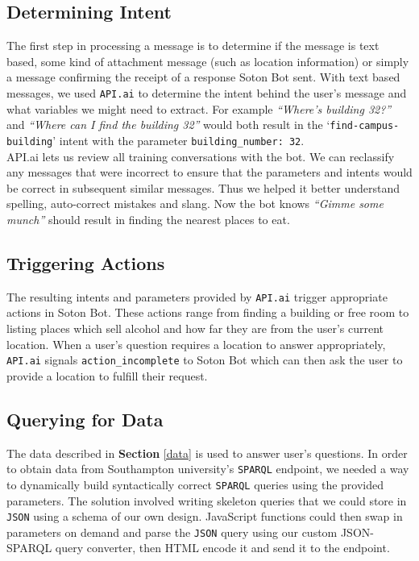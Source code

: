 \documentclass[journal, a4paper]{IEEEtran}
\begin{document}
\subsection{Determining Intent}
The first step in processing a message is to determine if the message is text based, some kind of attachment message (such as location information) or simply a message confirming the receipt of a response Soton Bot sent. With text based messages, we used \texttt{API.ai} to determine the intent behind the user's message and what variables we might need to extract. For example \textit{``Where's building 32?''} and \textit{``Where can I find the building 32''} would both result in the `\texttt{find-campus-building}' intent with the parameter \texttt{building\_number: 32}.\\

API.ai lets us review all training conversations with the bot. We can reclassify any messages that were incorrect to ensure that the parameters and intents would be correct in subsequent similar messages. Thus we helped it better understand spelling, auto-correct mistakes and  slang. Now the bot knows \textit{``Gimme some munch''} should result in finding the nearest places to eat.\\ 

\subsection{Triggering Actions}
The resulting intents and parameters provided by \texttt{API.ai} trigger appropriate actions in Soton Bot. These actions range from finding a building or free room to listing places which sell alcohol and how far they are from the user's current location. When a user's question requires a location to answer appropriately, \texttt{API.ai} signals \texttt{action\_incomplete} to Soton Bot which can then ask the user to provide a location to fulfill their request.\\ 

\subsection{Querying for Data}
The data described in \textbf{Section} \ref{data} is used to answer user's questions. In order to obtain data from Southampton university's \texttt{SPARQL} endpoint, we needed a way to dynamically build syntactically correct \texttt{SPARQL} queries using the provided parameters. The solution involved writing skeleton queries that we could store in \texttt{JSON} using a schema of our own design. JavaScript functions could then swap in parameters on demand and parse the \texttt{JSON} query using our custom JSON-SPARQL query converter, then HTML encode it and send it to the endpoint.\\
\end{document}
